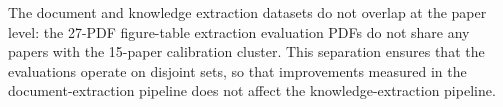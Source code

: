 The document and knowledge extraction datasets do not overlap at the paper level: the 27-PDF figure-table extraction evaluation PDFs do not share any papers with the 15-paper calibration cluster. This separation ensures that the evaluations operate on disjoint sets, so that improvements measured in the document-extraction pipeline does not affect the knowledge-extraction pipeline.




